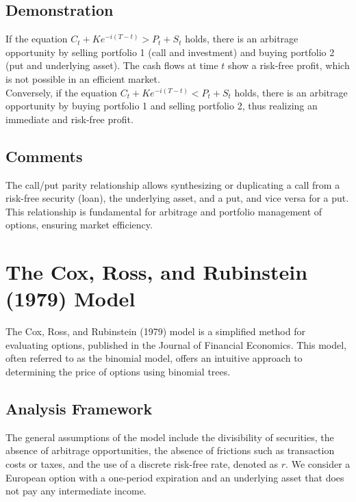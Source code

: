 \documentclass[a4paper,10pt]{article}
\begin{document}
    \subsection*{Demonstration}

        \noindent If the equation \( C_t + K e^{-i(T-t)} > P_t + S_t \) holds, there is an arbitrage opportunity by selling portfolio 1 (call and investment) and buying portfolio 2 (put and underlying asset). The cash flows at time \( t \) show a risk-free profit, which is not possible in an efficient market. \\
        
        \noindent Conversely, if the equation \( C_t + K e^{-i(T-t)} < P_t + S_t \) holds, there is an arbitrage opportunity by buying portfolio 1 and selling portfolio 2, thus realizing an immediate and risk-free profit.
        
    \subsection*{Comments}

        \noindent The call/put parity relationship allows synthesizing or duplicating a call from a risk-free security (loan), the underlying asset, and a put, and vice versa for a put. This relationship is fundamental for arbitrage and portfolio management of options, ensuring market efficiency.
        
\section*{The Cox, Ross, and Rubinstein (1979) Model}

    \noindent The Cox, Ross, and Rubinstein (1979) model is a simplified method for evaluating options, published in the Journal of Financial Economics. This model, often referred to as the binomial model, offers an intuitive approach to determining the price of options using binomial trees.
    
    \subsection*{Analysis Framework}
    
        \noindent The general assumptions of the model include the divisibility of securities, the absence of arbitrage opportunities, the absence of frictions such as transaction costs or taxes, and the use of a discrete risk-free rate, denoted as \( r \). We consider a European option with a one-period expiration and an underlying asset that does not pay any intermediate income.
    
\end{document}
